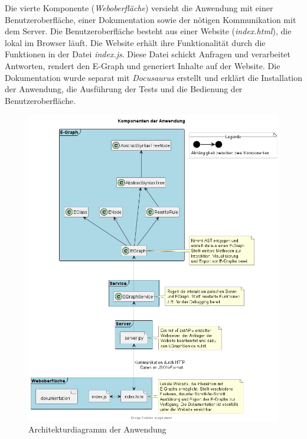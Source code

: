 
Die vierte Komponente (\textit{Weboberfläche}) versieht die Anwendung mit einer Benutzeroberfläche, einer Dokumentation sowie der nötigen Kommunikation mit dem Server.
Die Benutzeroberfläche besteht aus einer Website (\textit{index.html}), die lokal im Browser läuft. Die Website erhält ihre Funktionalität durch die Funktionen in der 
Datei \textit{index.js}. Diese Datei schickt Anfragen und verarbeitet Antworten, rendert den E-Graph und generiert Inhalte auf der Website. 
Die Dokumentation wurde separat mit \textit{Docusaurus} erstellt und erklärt die Installation der Anwendung, die Ausführung der Tests und die Bedienung der Benutzeroberfläche.  



\begin{figure}[H]
  \centering
  \includegraphics[scale=0.6]{../fig/components.png}
  \caption{Architekturdiagramm der Anwendung}
  \label{fig:architektur}
\end{figure}

